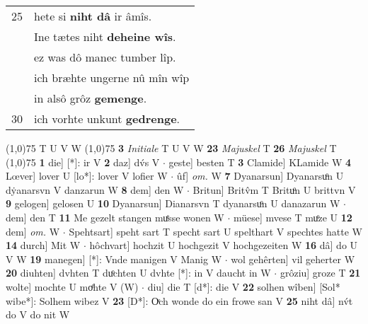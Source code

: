 \documentclass[8pt,a4paper,notitlepage]{article}
\begin{document}
\begin{table}[ht]
\begin{minipage}[t]{0.5\linewidth}
\begin{tabular}{rl}
25 & hete si \textbf{niht dâ} ir âmîs.\\ 
 & Ine tætes niht \textbf{deheine wîs}.\\ 
 & ez was dô manec tumber lîp.\\ 
 & ich bræhte ungerne nû mîn wîp\\ 
 & in alsô grôz \textbf{gemenge}.\\ 
30 & ich vorhte unkunt \textbf{gedrenge}.\\ 
\end{tabular}
\scriptsize
\line(1,0){75} \newline
T U V W \newline
\line(1,0){75} \newline
\textbf{3} \textit{Initiale} T U V W  \textbf{23} \textit{Majuskel} T  \textbf{26} \textit{Majuskel} T  \newline
\line(1,0){75} \newline
\textbf{1} die] [*]: ir V \textbf{2} daz] dv́s V  $\cdot$ geste] besten T \textbf{3} Clamide] KLamide W \textbf{4} Lœver] lover U [lo*]: lover V lofier W  $\cdot$ ûf] \textit{om.} W \textbf{7} Dyanarsun] Dyanarsuͦn U dẏanarsvn V danzarun W \textbf{8} dem] den W  $\cdot$ Britun] Britv̂m T Brituͦn U brittvn V \textbf{9} gelogen] gelosen U \textbf{10} Dyanarsun] Dianarsvn T dyanarsuͦn U danazarun W  $\cdot$ dem] den T \textbf{11} Me gezelt stangen muͤsse wonen W  $\cdot$ müese] mvese T muͦze U \textbf{12} dem] \textit{om.} W  $\cdot$ Spehtsart] speht sart T specht sart U spelthart V spechtes hatte W \textbf{14} durch] Mit W  $\cdot$ hôchvart] hochzit U hochgezit V hochgezeiten W \textbf{16} dâ] do U V W \textbf{19} manegen] [*]: Vnde manigen V Manig W  $\cdot$ wol gehêrten] vil geherter W \textbf{20} diuhten] dvhten T duͦchten U dvhte [*]: in V daucht in W  $\cdot$ grôziu] groze T \textbf{21} wolte] mochte U moͤhte V (W)  $\cdot$ diu] die T [d*]: die V \textbf{22} solhen wîben] [Sol* wibe*]: Solhem wibez V \textbf{23} [D*]: Oͮch wonde do ein frowe san V \textbf{25} niht dâ] nv́t do V do nit W \newline
\end{minipage}
\end{table}
\end{document}
